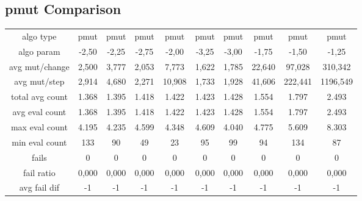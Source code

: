 \subsection{pmut Comparison}
\begin{tabular}[h]{cccccccccc}
algo type&             pmut&      pmut&      pmut&      pmut&      pmut&      pmut&      pmut&      pmut&      pmut\\
algo param&           -2,50&     -2,25&     -2,75&     -2,00&     -3,25&     -3,00&     -1,75&     -1,50&     -1,25\\
avg mut/change&       2,500&     3,777&     2,053&     7,773&     1,622&     1,785&    22,640&    97,028&   310,342\\
avg mut/step&         2,914&     4,680&     2,271&    10,908&     1,733&     1,928&    41,606&   222,441&  1196,549\\
\hline
total avg count&      1.368&     1.395&     1.418&     1.422&     1.423&     1.428&     1.554&     1.797&     2.493\\
avg eval count&       1.368&     1.395&     1.418&     1.422&     1.423&     1.428&     1.554&     1.797&     2.493\\
max eval count&       4.195&     4.235&     4.599&     4.348&     4.609&     4.040&     4.775&     5.609&     8.303\\
min eval count&         133&        90&        49&        23&        95&        99&        94&       134&        87\\
\hline
fails&                    0&         0&         0&         0&         0&         0&         0&         0&         0\\
fail ratio&           0,000&     0,000&     0,000&     0,000&     0,000&     0,000&     0,000&     0,000&     0,000\\
avg fail dif&            -1&        -1&        -1&        -1&        -1&        -1&        -1&        -1&        -1\\
\end{tabular}
